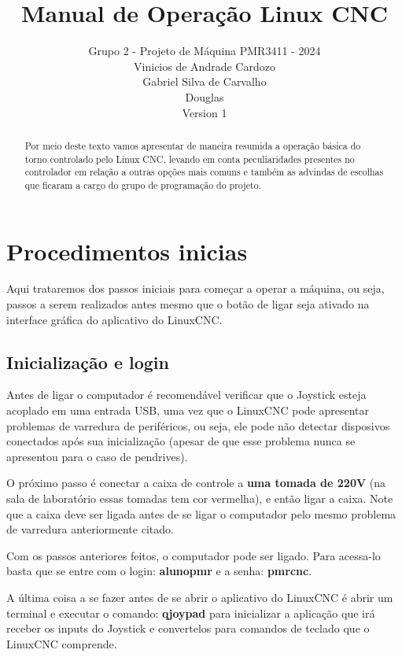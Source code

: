 \documentclass[twoside,a4paper]{refart}
\title{Manual de Operação Linux CNC}
\author{Grupo 2 - Projeto de Máquina PMR3411 - 2024 \\
Vinicios de Andrade Cardozo \\
Gabriel Silva de Carvalho  \\
Douglas \\
Version 1}
\date{}
\begin{document}
\maketitle

\begin{abstract}
Por meio deste texto vamos apresentar de maneira resumida a operação básica do torno controlado pelo Linux CNC, levando em conta peculiaridades presentes no controlador em relação a outras opções mais comuns e também as advindas de escolhas que ficaram a cargo do grupo de programação do projeto.
\end{abstract}

\tableofcontents

\newpage



\section{Procedimentos inicias}

Aqui trataremos dos passos iniciais para começar a operar a máquina, ou seja, passos a serem realizados antes mesmo que o botão de ligar seja ativado na interface gráfica do aplicativo do LinuxCNC. 

\subsection{Inicialização e login}

Antes de ligar o computador é recomendável verificar que o Joystick esteja acoplado em uma entrada USB, uma vez que o LinuxCNC pode apresentar problemas de varredura de periféricos, ou seja, ele pode não detectar disposivos conectados após sua inicialização (apesar de que esse problema nunca se apresentou para o caso de pendrives).

O próximo passo é conectar a caixa de controle a \textbf{uma tomada de 220V} (na sala de laboratório essas tomadas tem cor vermelha), e então ligar a caixa. Note que a caixa deve ser ligada antes de se ligar o computador pelo mesmo problema de varredura anteriormente citado.

Com os passos anteriores feitos, o computador pode ser ligado. Para acessa-lo basta que se entre com o login: \textbf{alunopmr} e a senha: \textbf{pmrcnc}. 

A última coisa a se fazer antes de se abrir o aplicativo do LinuxCNC é abrir um terminal e executar o comando: \textbf{qjoypad} para inicializar a aplicação que irá receber os inputs do Joystick e convertelos para comandos de teclado que o LinuxCNC comprende. 
\end{document}

